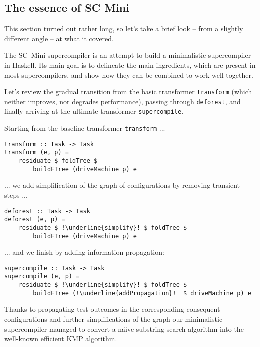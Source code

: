 \subsection{The essence of SC Mini}

This section turned out rather long, so let's take a brief look -- from 
a slightly different angle -- at what it covered.

The SC~Mini supercompiler is an attempt to build a minimalistic supercompiler in Haskell.
Its main goal is to delineate the main ingredients, which are present in most supercompilers,
and show how they can be combined to work well together.

Let's review the gradual transition from the basic transformer \texttt{transform}
(which neither improves, nor degrades performance), passing through \texttt{deforest},
and finally arriving at the ultimate transformer \texttt{supercompile}.

\noindent Starting from the baseline transformer \texttt{transform} ...
\begin{lstlisting}[escapechar=!]
transform :: Task -> Task
transform (e, p) =
	residuate $ foldTree $
		buildFTree (driveMachine p) e
\end{lstlisting}
... we add simplification of the graph of configurations by removing transient steps ...
\begin{lstlisting}[escapechar=!]
deforest :: Task -> Task
deforest (e, p) =
	residuate $ !\underline{simplify}! $ foldTree $
    	buildFTree (driveMachine p) e
\end{lstlisting}
... and we finish by adding information propagation:
\begin{lstlisting}[escapechar=!]
supercompile :: Task -> Task
supercompile (e, p) =
	residuate $ !\underline{simplify}! $ foldTree $
		buildFTree (!\underline{addPropagation}!  $ driveMachine p) e
\end{lstlisting}

Thanks to propagating test outcomes in the corresponding consequent configurations
and further simplifications of the graph our minimalistic supercompiler
managed to convert a na\"{\i}ve substring search algorithm into the well-known
efficient KMP algorithm.

